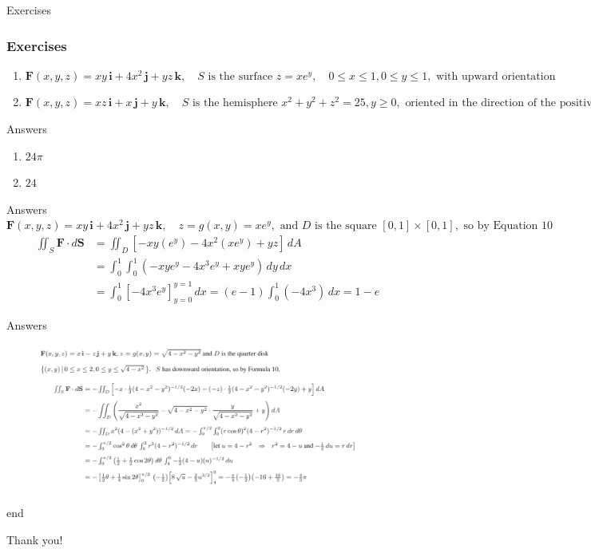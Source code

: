 \documentclass[aspectratio=169]{beamer}
\begin{document}
\begin{frame}{Exercises}
    \frametitle{Exercises}
    \begin{enumerate}
        \item $\mathbf{F}(x, y, z) = xy\,\mathbf{i} + 4x^2\,\mathbf{j} + yz\,\mathbf{k}, \quad S \text{ is the surface } z = xe^y, \quad 0 \le x \le 1, 0 \le y \le 1, \text{ with upward orientation}$
        \item $\mathbf{F}(x, y, z) = xz\,\mathbf{i} + x\,\mathbf{j} + y\,\mathbf{k}, \quad S \text{ is the hemisphere } x^2 + y^2 + z^2 = 25, y \ge 0, \text{ oriented in the direction of the positive y-axis}$
    \end{enumerate}
\end{frame}

\begin{frame}{Answers}
    \begin{enumerate}
        \item $24 \pi$
        \item $24$
    \end{enumerate}
\end{frame}

\begin{frame}{Answers}
    $\mathbf{F}(x, y, z) = xy\,\mathbf{i} + 4x^2\,\mathbf{j} + yz\,\mathbf{k}, \quad z = g(x, y) = xe^y, \text{ and } D \text{ is the square } [0, 1] \times [0, 1], \text{ so by Equation 10}$
                \begin{align*}
                    \iint_S \mathbf{F} \cdot d\mathbf{S} &= \iint_D [-xy(e^y) - 4x^2(xe^y) + yz] \, dA \\
                    &= \int_0^1 \int_0^1 (-xye^y - 4x^3 e^y + xye^y) \, dy \, dx \\
                    &= \int_0^1 \left[-4x^3 e^y\right]_{y=0}^{y=1} \, dx = (e-1) \int_0^1 (-4x^3) \, dx = 1-e
                \end{align*}
\end{frame}

\begin{frame}{Answers}
   \begin{figure}
            \centering
            \includegraphics[width=1\linewidth]{ans.png}
            \label{fig:enter-label}
        \end{figure}

\end{frame}

\begin{frame}{\textcolor{green!30!black}{end}}
    \begin{center}
        \LARGE Thank you!
    \end{center}
\end{frame}
\end{document}
